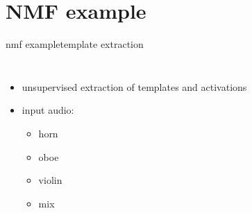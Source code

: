    \section[example]{NMF example}
        \begin{frame}{nmf example}{template extraction}
            \vspace{-3mm}
            \begin{columns}
                    \begin{itemize}
                        \item   unsupervised extraction of templates and activations
                        \item   input audio: 
                            \begin{itemize}
                                \item  {} horn
                                \item  {} oboe
                                \item  {} violin
                                \item  {} mix
                            \end{itemize}
                    \end{itemize}
            \end{columns}
        \end{frame}
        
